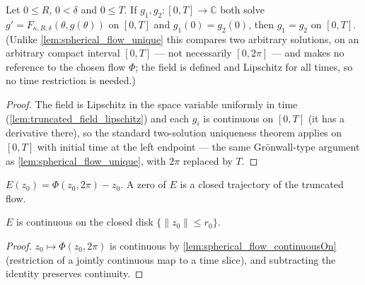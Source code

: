 \begin{lemma}
  \label{lem:truncated_field_solution_unique}
  Let $0\le R$, $0<\delta$ and $0\le T$. If $g_1,g_2:[0,T]\to\mathbb C$ both solve
  $g'=F_{\kappa,R,\delta}(\theta,g(\theta))$ on $[0,T]$ and $g_1(0)=g_2(0)$, then
  $g_1=g_2$ on $[0,T]$. (Unlike \cref{lem:spherical_flow_unique} this compares two
  arbitrary solutions, on an arbitrary compact interval $[0,T]$ — not necessarily
  $[0,2\pi]$ — and makes no reference to the chosen flow $\Phi$; the field is defined
  and Lipschitz for all times, so no time restriction is needed.)
\end{lemma}

\begin{proof}

\leanok
  The field is Lipschitz in the space variable uniformly in time
  (\cref{lem:truncated_field_lipschitz}) and each $g_i$ is continuous on $[0,T]$ (it has
  a derivative there), so the standard two-solution uniqueness theorem applies on
  $[0,T]$ with initial time at the left endpoint — the same Gr\"onwall-type argument as
  \cref{lem:spherical_flow_unique}, with $2\pi$ replaced by $T$.
\end{proof}

\begin{definition}

  \label{def:spherical_endpoint}
  $E(z_0)=\Phi(z_0,2\pi)-z_0$. A zero of $E$ is a closed trajectory of the truncated
  flow.
\end{definition}

\begin{lemma}

  \label{lem:spherical_endpoint_continuousOn}
  $E$ is continuous on the closed disk $\{\|z_0\|\le r_0\}$.
\end{lemma}

\begin{proof}

\leanok
  $z_0\mapsto\Phi(z_0,2\pi)$ is continuous by \cref{lem:spherical_flow_continuousOn}
  (restriction of a jointly continuous map to a time slice), and subtracting the identity
  preserves continuity.
\end{proof}

